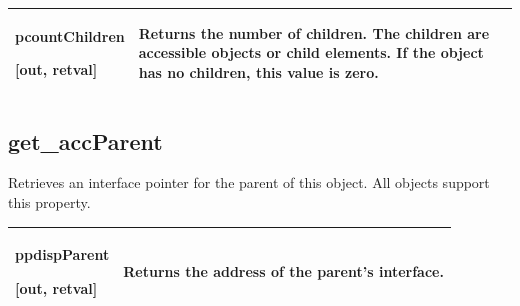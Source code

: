 \documentclass[letterpaper,12pt,english,openany,oneside]{sphinxmanual}
\begin{document}
\begin{sphinxVerbatim}[commandchars=\\\{\}]
  
\end{sphinxVerbatim}



\begin{savenotes}\sphinxattablestart
\centering
{}\label{\detokenize{MSAA_PDF:section-3}}\nobreak
\begin{tabulary}{\linewidth}[t]{|T|T|}
\hline

pcountChildren

{[}out, retval{]}
&
Returns the number of children. The children are accessible objects or child elements. If the object has no children, this value is zero.
\\
\hline
\end{tabulary}
\par
\sphinxattableend\end{savenotes}


\begin{sphinxVerbatim}[commandchars=\\\{\}]
\end{sphinxVerbatim}


\subsection{get\_accParent}
\label{\detokenize{MSAA_PDF:get-accparent}}
Retrieves an  interface pointer for the parent of this object. All objects support this property.

\begin{sphinxVerbatim}[commandchars=\\\{\}]
  
\end{sphinxVerbatim}



\begin{savenotes}\sphinxattablestart
\centering
{}\label{\detokenize{MSAA_PDF:section-4}}\nobreak
\begin{tabulary}{\linewidth}[t]{|T|T|}
\hline

ppdispParent

{[}out, retval{]}
&
Returns the address of the parent’s  interface.
\\
\hline
\end{tabulary}
\par
\sphinxattableend\end{savenotes}
\end{document}
